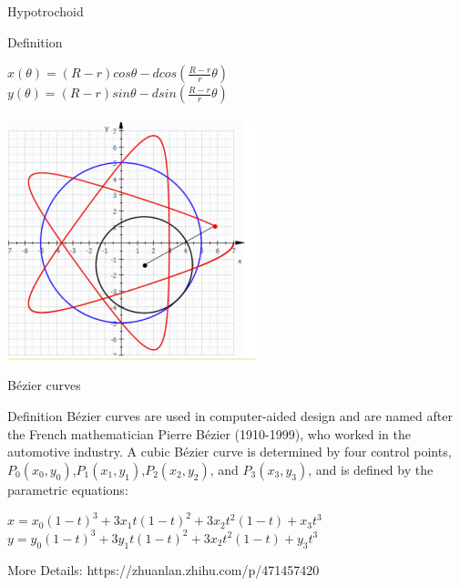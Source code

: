 \begin{frame}{Hypotrochoid}
    \begin{block}{Definition}
        \begin{center}
            $x(\theta)=(R-r)cos\theta-d cos(\frac{R-r}{r}\theta)$\\
            $y(\theta)=(R-r)sin\theta-d sin(\frac{R-r}{r}\theta)$\\~\\
            \includegraphics[width=0.55\linewidth]{res/Hypotrochoid.png}
        \end{center}
    \end{block}
\end{frame}

\begin{frame}{Bézier curves}
    \begin{block}{Definition}
        Bézier curves are used in computer-aided design and are named after the
        French mathematician Pierre Bézier (1910-1999), who worked in the
        automotive industry. A cubic Bézier curve is determined by four control
        points, $P_0 (x_0,y_0)$,$P_1 (x_1,y_1)$,$P_2 (x_2,y_2)$, and $P_3 (x_3,y_3)$, and is defined by the parametric equations:
        \begin{center}
            $x=x_0 (1-t)^3 + 3x_1 t(1-t)^2 + 3x_2 t^2(1-t)+ x_3 t^3$\\
            $y=y_0 (1-t)^3 + 3y_1 t(1-t)^2 + 3x_2 t^2(1-t)+ y_3 t^3$
        \end{center}
    \end{block}
    More Details: https://zhuanlan.zhihu.com/p/471457420
\end{frame}

